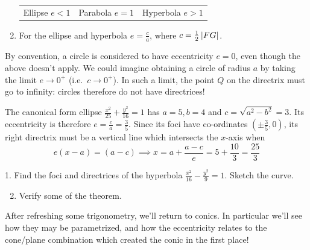 \begin{thm}{}{}
\begin{enumerate}
\begin{center}
\begin{tabular}{c@{\qquad}c@{\qquad\qquad}c}
		\\
		Ellipse $e<1$&Parabola $e=1$&Hyperbola $e>1$
		\end{tabular}
	\end{center}
	\item For the ellipse and hyperbola $e=\frac ca$, where $c=\frac 12\left| FG\right|$.
\end{enumerate}
\end{thm}

By convention, a circle is considered to have eccentricity $e=0$, even though the above doesn't apply. We could imagine obtaining a circle of radius $a$ by taking the limit $e\to 0^+$ (i.e.\ $c\to 0^+$). In such a limit, the point $Q$ on the directrix must go to infinity: circles therefore do not have directrices!

\begin{example}{}{}
The canonical form ellipse $\frac{x^2}{25}+\frac{y^2}{16}=1$ has $a=5,b=4$ and $c=\sqrt{a^2-b^2}=3$. Its eccentricity is therefore $e=\frac ca=\frac 35$. Since its foci have co-ordinates $(\pm\frac 35,0)$, its right directrix must be a vertical line which intersects the $x$-axis when
\[e(x-a)=(a-c)\implies x=a+\frac{a-c}e=5+\frac{10}3=\frac{25}3\]
\end{example}

\begin{exercises}{}{}
\hangindent\leftmargini
\textup{1. } Find the foci and directrices of the hyperbola $\frac{x^2}{16}-\frac{y^2}{9}=1$. Sketch the curve.
\begin{enumerate}\setcounter{enumi}{1}
  \item Verify some of the theorem. 
\end{enumerate}
\end{exercises}

After refreshing some trigonometry, we'll return to conics. In particular we'll see how they may be parametrized, and how the eccentricity relates to the cone/plane combination which created the conic in the first place!





